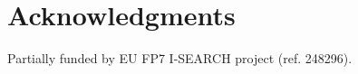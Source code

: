 \documentclass{acm_proc_article-sp}
\begin{document}

\section{Acknowledgments}\label{sec:acknowledgments}
Partially funded by EU FP7 I-SEARCH project (ref. 248296).

%

%
%

\end{document}
